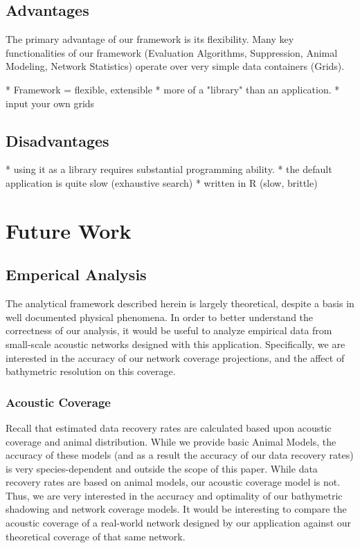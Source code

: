 \subsection{Advantages}
The primary advantage of our framework is its flexibility.  Many key functionalities of our framework (Evaluation Algorithms, Suppression, Animal Modeling, Network Statistics) operate over very simple data containers (Grids).   

* Framework = flexible, extensible
* more of a "library" than an application.
* input your own grids

\subsection{Disadvantages}
* using it as a library requires substantial programming ability.
* the default application is quite slow (exhaustive search)
* written in R (slow, brittle)

\section{Future Work}
\subsection{Emperical Analysis}
The analytical framework described herein is largely theoretical, despite a basis in well documented physical phenomena.  In order to better understand the correctness of our analysis, it would be useful to analyze empirical data from small-scale acoustic networks designed with this application.  Specifically, we are interested in the accuracy of our network coverage projections, and the affect of bathymetric resolution on this coverage.  

\subsubsection{Acoustic Coverage}
Recall that estimated data recovery rates are calculated based upon acoustic coverage and animal distribution.  While we provide basic Animal Models, the accuracy of these models (and as a result the accuracy of our data recovery rates) is very species-dependent and outside the scope of this paper.  While data recovery rates are based on animal models, our acoustic coverage model is not.  Thus, we are very interested in the accuracy and optimality of our bathymetric shadowing and network coverage models.  It would be interesting to compare the acoustic coverage of a real-world network designed by our application against our theoretical coverage of that same network.


